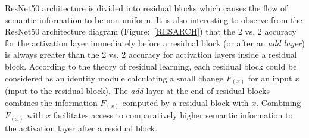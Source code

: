 ResNet50 architecture is divided into residual blocks which causes the flow of semantic information to be non-uniform. 
It is also interesting to observe from the ResNet50 architecture diagram (Figure:~\ref{RESARCH}) that the 2 vs. 2 accuracy for the activation layer immediately before a residual block (or after an \textit{add layer}) is always greater than the 2 vs. 2 accuracy for activation layers inside a residual block. According to the theory of residual learning, each residual block could be considered as an identity module calculating a small change $F_{(x)}$ for an input $x$ (input to the residual block). The \textit{add} layer at the end of residual blocks combines the information $F_{(x)}$ computed by a residual block with $x$. Combining $F_{(x)}$ with $x$ facilitates access to comparatively higher semantic information to the activation layer after a residual block. 
